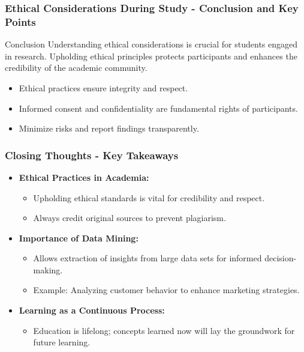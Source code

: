 \documentclass[aspectratio=169]{beamer}
\begin{document}
\begin{frame}[fragile]
    \frametitle{Ethical Considerations During Study - Conclusion and Key Points}
    \begin{block}{Conclusion}
        Understanding ethical considerations is crucial for students engaged in research. Upholding ethical principles protects participants and enhances the credibility of the academic community.
    \end{block}
    \begin{itemize}
        \item Ethical practices ensure integrity and respect.
        \item Informed consent and confidentiality are fundamental rights of participants.
        \item Minimize risks and report findings transparently.
    \end{itemize}
\end{frame}

\begin{frame}[fragile]
    \frametitle{Closing Thoughts - Key Takeaways}
    \begin{itemize}
        \item \textbf{Ethical Practices in Academia:}
            \begin{itemize}
                \item Upholding ethical standards is vital for credibility and respect.
                \item Always credit original sources to prevent plagiarism.
            \end{itemize}
        \item \textbf{Importance of Data Mining:}
            \begin{itemize}
                \item Allows extraction of insights from large data sets for informed decision-making.
                \item Example: Analyzing customer behavior to enhance marketing strategies.
            \end{itemize}
        \item \textbf{Learning as a Continuous Process:}
            \begin{itemize}
                \item Education is lifelong; concepts learned now will lay the groundwork for future learning.
            \end{itemize}
    \end{itemize}
\end{frame}
\end{document}
